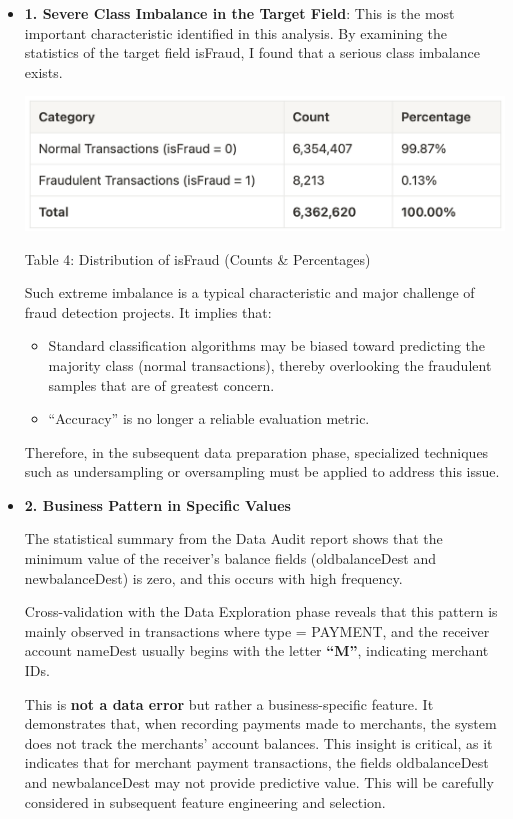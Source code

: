 \documentclass[sigplan,screen]{acmart}
\begin{document}
\begin{itemize}
\item \textbf{1. Severe Class Imbalance in the Target Field}: This is the most important characteristic identified in this analysis. By examining the statistics of the target field isFraud, I found that a serious class imbalance exists.

\vspace{0.3cm}

\begin{center}
\includegraphics[width=0.9\columnwidth]{table4.jpg}
\vspace{0.2cm}

Table 4: Distribution of isFraud (Counts \& Percentages)
\end{center}

\vspace{0.3cm}

Such extreme imbalance is a typical characteristic and major challenge of fraud detection projects. It implies that:

\begin{itemize}
\item {Standard classification algorithms may be biased toward predicting the majority class (normal transactions), thereby overlooking the fraudulent samples that are of greatest concern.}
\item {``Accuracy'' is no longer a reliable evaluation metric.}
\end{itemize}

Therefore, in the subsequent data preparation phase, specialized techniques such as undersampling or oversampling must be applied to address this issue.

\item \textbf{2. Business Pattern in Specific Values}

The statistical summary from the Data Audit report shows that the minimum value of the receiver's balance fields (oldbalanceDest and newbalanceDest) is zero, and this occurs with high frequency.

Cross-validation with the Data Exploration phase reveals that this pattern is mainly observed in transactions where type = PAYMENT, and the receiver account nameDest usually begins with the letter \textbf{``M''}, indicating merchant IDs.

This is \textbf{not a data error} but rather a business-specific feature. It demonstrates that, when recording payments made to merchants, the system does not track the merchants' account balances. This insight is critical, as it indicates that for merchant payment transactions, the fields oldbalanceDest and newbalanceDest may not provide predictive value. This will be carefully considered in subsequent feature engineering and selection.
\end{itemize}
\end{document}
